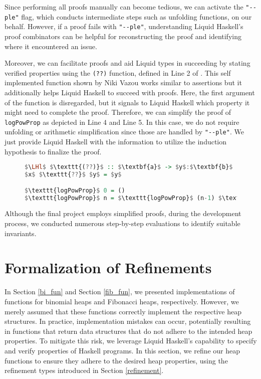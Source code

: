 \documentclass{clmthesis}
\begin{document}
Since performing all proofs manually can become tedious, we can activate the \texttt{"-\;-\;ple"} flag, which conducts intermediate steps such as unfolding functions, on our behalf. However, if a proof fails with \texttt{"-\;-\;ple"}, understanding Liquid Haskell's proof combinators can be helpful for reconstructing the proof and identifying where it encountered an issue.

Moreover, we can facilitate proofs and aid Liquid types in succeeding by stating verified properties using the \texttt{(??)} function, defined in Line 2 of . 
This self implemented function shown by Niki Vazou works similar to assertions but it additionally helps Liquid Haskell to succeed with proofs.
Here, the first argument of the function is disregarded, but it signals to Liquid Haskell which property it might need to complete the proof. Therefore, we can simplify the proof of \texttt{logPowProp} as depicted in Line 4 and Line 5. In this case, we do not require unfolding or arithmetic simplification since those are handled by \texttt{"-\;-\;ple"}. We just provide Liquid Haskell with the information to utilize the induction hypothesis to finalize the proof.


\begin{figure}[h]
\begin{lstlisting}[mathescape=true, language=haskell, caption={Function $\texttt{(??)}$ and simplified \texttt{logPowProp}.},captionpos=b, label=fig:??]
$\LHl$ $\texttt{(??)}$ :: $\textbf{a}$ -> $y$:$\textbf{b}$ -> {$v$:$\textbf{b}$ | $v$ $==$ $y$} $\LHr$
$x$ $\texttt{??}$ $y$ = $y$ 

$\texttt{logPowProp}$ 0 = ()
$\texttt{logPowProp}$ n = $\texttt{logPowProp}$ (n-1) $\texttt{??}$ ()
\end{lstlisting}
\end{figure}

Although the final project employs simplified proofs, during the development process, we conducted numerous step-by-step evaluations to identify suitable invariants.


\section{Formalization of Refinements}\label{formalization_ref}
In Section \ref{bi_fun} and Section \ref{fib_fun}, we presented implementations of functions for binomial heaps and Fibonacci heaps, respectively. However, we merely assumed that these functions correctly implement the respective heap structures. In practice, implementation mistakes can occur, potentially resulting in functions that return data structures that do not adhere to the intended heap properties. To mitigate this risk, we leverage Liquid Haskell's capability to specify and verify properties of Haskell programs. In this section, we refine our heap functions to ensure they adhere to the desired heap properties, using the refinement types introduced in Section \ref{refinement}.
\end{document}

